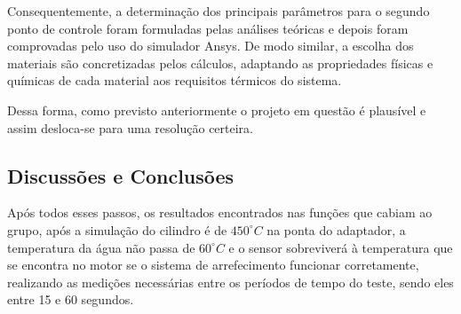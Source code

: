 Consequentemente, a determinação dos principais parâmetros para o segundo ponto de controle foram formuladas pelas análises teóricas e depois foram comprovadas pelo uso do simulador Ansys. De modo similar, a escolha dos materiais são concretizadas pelos cálculos, adaptando as propriedades físicas e químicas de cada material aos requisitos térmicos do sistema.

Dessa forma, como previsto anteriormente o projeto em questão é plausível e assim desloca-se para uma resolução certeira.

\subsection{Discussões e Conclusões}

Após todos esses passos, os resultados encontrados nas funções que cabiam ao grupo, após a simulação do cilindro é de $450^{\circ}C$ na ponta do adaptador, a temperatura da água não passa de $60^{\circ}C$ e o sensor sobreviverá à temperatura que se encontra no motor se o sistema de arrefecimento funcionar corretamente, realizando as medições necessárias entre os períodos de tempo do teste, sendo eles entre 15 e 60 segundos.
